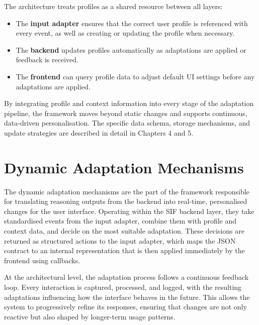 \documentclass[openany]{book}
\begin{document}
The architecture treats profiles as a shared resource between all layers:
\begin{itemize}
    \item The \textbf{input adapter} ensures that the correct user profile is referenced with every event, as well as creating or updating the profile when necessary.
    \item The \textbf{backend} updates profiles automatically as adaptations are applied or feedback is received.
    \item The \textbf{frontend} can query profile data to adjust default UI settings before any adaptations are applied.
\end{itemize}
By integrating profile and context information into every stage of the adaptation pipeline, the framework moves beyond static changes and supports continuous, data-driven personalisation. The specific data schema, storage mechanisms, and update strategies are described in detail in Chapters 4 and 5.

\section{Dynamic Adaptation Mechanisms}
The dynamic adaptation mechanisms are the part of the framework responsible for translating reasoning outputs from the backend into real-time, personalised changes for the user interface. Operating within the SIF backend layer, they take standardised events from the input adapter, combine them with profile and context data, and decide on the most suitable adaptation. These decisions are returned as structured actions to the input adapter, which maps the JSON contract to an internal representation that is then applied immediately by the frontend using callbacks.

At the architectural level, the adaptation process follows a continuous feedback loop. Every interaction is captured, processed, and logged, with the resulting adaptations influencing how the interface behaves in the future. This allows the system to progressively refine its responses, ensuring that changes are not only reactive but also shaped by longer-term usage patterns.
\end{document}
